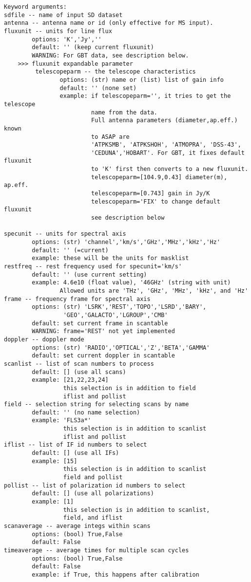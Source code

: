 \begin{verbatim}
Keyword arguments:
sdfile -- name of input SD dataset
antenna -- antenna name or id (only effective for MS input).
fluxunit -- units for line flux
        options: 'K','Jy',''
        default: '' (keep current fluxunit)
        WARNING: For GBT data, see description below.
    >>> fluxunit expandable parameter
         telescopeparm -- the telescope characteristics
                options: (str) name or (list) list of gain info
                default: '' (none set)
                example: if telescopeparm='', it tries to get the telescope
                         name from the data.
                         Full antenna parameters (diameter,ap.eff.) known
                         to ASAP are
                         'ATPKSMB', 'ATPKSHOH', 'ATMOPRA', 'DSS-43',
                         'CEDUNA','HOBART'. For GBT, it fixes default fluxunit
                         to 'K' first then converts to a new fluxunit.
                         telescopeparm=[104.9,0.43] diameter(m), ap.eff.
                         telescopeparm=[0.743] gain in Jy/K
                         telescopeparm='FIX' to change default fluxunit
                         see description below

specunit -- units for spectral axis
        options: (str) 'channel','km/s','GHz','MHz','kHz','Hz'
        default: '' (=current)
        example: these will be the units for masklist
restfreq -- rest frequency used for specunit='km/s'
        default: '' (use current setting)
        example: 4.6e10 (float value), '46GHz' (string with unit)
                Allowed units are 'THz', 'GHz', 'MHz', 'kHz', and 'Hz'
frame -- frequency frame for spectral axis
        options: (str) 'LSRK','REST','TOPO','LSRD','BARY',
                 'GEO','GALACTO','LGROUP','CMB'
        default: set current frame in scantable
        WARNING: frame='REST' not yet implemented
doppler -- doppler mode
        options: (str) 'RADIO','OPTICAL','Z','BETA','GAMMA'
        default: set current doppler in scantable
scanlist -- list of scan numbers to process
        default: [] (use all scans)
        example: [21,22,23,24]
                 this selection is in addition to field
                 iflist and pollist
field -- selection string for selecting scans by name
        default: '' (no name selection)
        example: 'FLS3a*'
                 this selection is in addition to scanlist
                 iflist and pollist
iflist -- list of IF id numbers to select
        default: [] (use all IFs)
        example: [15]
                 this selection is in addition to scanlist
                 field and pollist
pollist -- list of polarization id numbers to select
        default: [] (use all polarizations)
        example: [1]
                 this selection is in addition to scanlist,
                 field, and iflist
scanaverage -- average integs within scans
        options: (bool) True,False
        default: False
timeaverage -- average times for multiple scan cycles
        options: (bool) True,False
        default: False
        example: if True, this happens after calibration
        

\end{verbatim}
